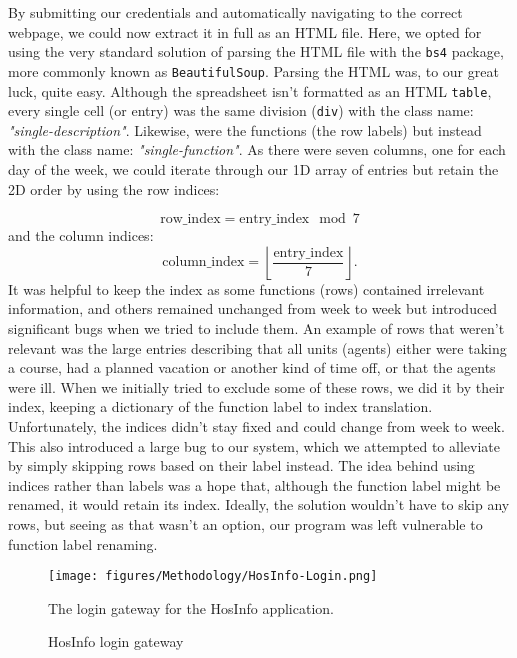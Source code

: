 By submitting our credentials and automatically navigating to the correct webpage, we could now extract it in full as an HTML file. Here, we opted for using the very standard solution of parsing the HTML file with the \texttt{bs4} package, more commonly known as \texttt{BeautifulSoup}. Parsing the HTML was, to our great luck, quite easy. Although the spreadsheet isn't formatted as an HTML \texttt{table}, every single cell (or entry) was the same division (\texttt{div}) with the class name: \emph{"single-description"}. Likewise, were the \gls{functions} (the row labels) but instead with the class name: \emph{"single-function"}. As there were seven columns, one for each day of the week, we could iterate through our 1D array of entries but retain the 2D order by using the row indices:

\begin{equation*}
    \text{row\_index} = \text{entry\_index} \mod 7
\end{equation*}
and the column indices:
\begin{equation*}
    \text{column\_index} = \left\lfloor
        \frac{\text{entry\_index}}{7}
    \right\rfloor.
\end{equation*}
It was helpful to keep the index as some \gls{functions} (rows) contained irrelevant information, and others remained unchanged from week to week but introduced significant bugs when we tried to include them. An example of rows that weren't relevant was the large entries describing that all units (agents) either were taking a course, had a planned vacation or another kind of time off, or that the agents were ill. When we initially tried to exclude some of these rows, we did it by their index, keeping a \gls{dictionary} of the \gls{function} label to index translation. Unfortunately, the indices didn't stay fixed and could change from week to week. This also introduced a large bug to our system, which we attempted to alleviate by simply skipping rows based on their label instead. The idea behind using indices rather than labels was a hope that, although the \gls{function} label might be renamed, it would retain its index. Ideally, the solution wouldn't have to skip any rows, but seeing as that wasn't an option, our program was left vulnerable to \gls{function} label renaming.

\begin{figure}[H]
    \centering
    \texttt{[image: figures/Methodology/HosInfo-Login.png]}
    \caption{HosInfo login gateway}
    \small
    \raggedright 
    The login gateway for the HosInfo application.
    \label{fig:HosInfo-login}
\end{figure}

